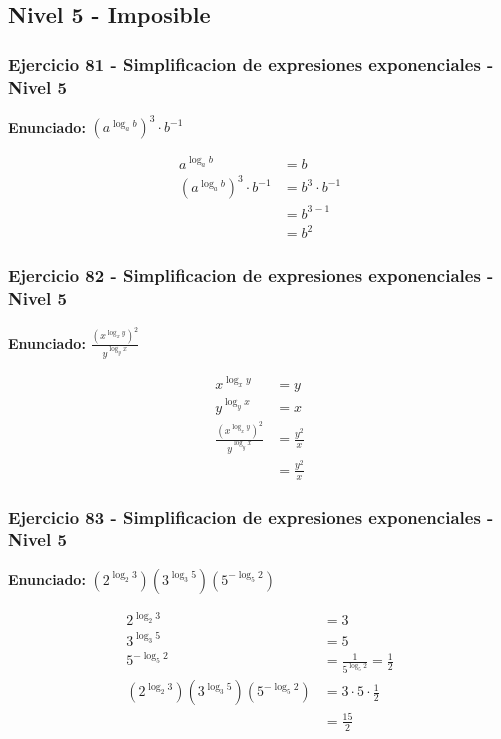 \documentclass[12pt,a4paper]{article}
\begin{document}
\newpage

\subsection*{Nivel 5 - Imposible}

\subsubsection*{Ejercicio 81 - Simplificacion de expresiones exponenciales - Nivel 5}
\textbf{Enunciado:} \((a^{\log_a b})^3\cdot b^{-1}\)

\[
\begin{aligned}
a^{\log_a b}&=b\\
(a^{\log_a b})^3\cdot b^{-1}&=b^3\cdot b^{-1}\\
&=b^{3-1}\\
&=\boxed{b^2}
\end{aligned}
\]


\subsubsection*{Ejercicio 82 - Simplificacion de expresiones exponenciales - Nivel 5}
\textbf{Enunciado:} \(\frac{(x^{\log_x y})^2}{y^{\log_y x}}\)

\[
\begin{aligned}
x^{\log_x y}&=y\\
y^{\log_y x}&=x\\
\frac{(x^{\log_x y})^2}{y^{\log_y x}}&=\frac{y^2}{x}\\
&=\boxed{\frac{y^2}{x}}
\end{aligned}
\]


\subsubsection*{Ejercicio 83 - Simplificacion de expresiones exponenciales - Nivel 5}
\textbf{Enunciado:} \((2^{\log_2 3})(3^{\log_3 5})(5^{-\log_5 2})\)

\[
\begin{aligned}
2^{\log_2 3}&=3\\
3^{\log_3 5}&=5\\
5^{-\log_5 2}&=\frac{1}{5^{\log_5 2}}=\frac12\\
(2^{\log_2 3})(3^{\log_3 5})(5^{-\log_5 2})&=3\cdot5\cdot\frac12\\
&=\boxed{\frac{15}{2}}
\end{aligned}
\]
\end{document}
